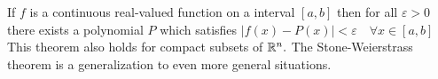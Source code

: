 \documentclass[12pt]{article}
\begin{document}
If $ f $ is a continuous real-valued function on a interval $ [a,b] $
then for all $ \varepsilon>0 $ there exists a polynomial $ P $
which satisfies $ |f(x)-P(x)|<\varepsilon \quad \forall x\in [a,b] $
This theorem also holds for compact subsets of $ \Bbb{R}^n . $
The Stone-Weierstrass theorem is a generalization to even more general situations.
\end{document}
